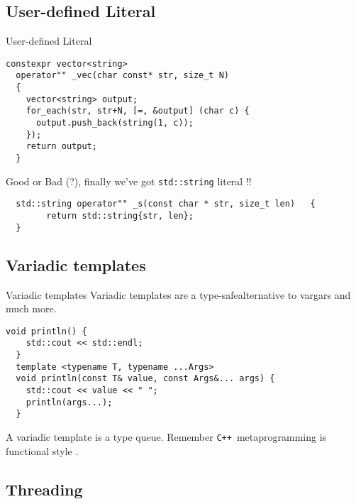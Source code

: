 \documentclass[svgnames,smaller]{beamer}
\newcommand*{\cpp}{\texttt{C++}}
\begin{document}
\subsection{User-defined Literal}

\begin{frame}[fragile]{User-defined Literal}
  \begin{lstlisting}[title={\texttt{""\_vec}}]
  constexpr vector<string>
  operator"" _vec(char const* str, size_t N)
  {
    vector<string> output;
    for_each(str, str+N, [=, &output] (char c) {
      output.push_back(string(1, c));
    });
    return output;
  }
  \end{lstlisting}

  \begin{block}{Good or Bad (?), finally we've got \texttt{std::string} literal !!}
    \begin{lstlisting}
  std::string operator"" _s(const char * str, size_t len)	{
	    return std::string{str, len};
  }
    \end{lstlisting}
  \end{block}
\end{frame}


\subsection{Variadic templates}

\begin{frame}[fragile]{Variadic templates}
  Variadic templates are a type-safe\footnotemark[1] alternative to vargars and
  much more.

  \begin{lstlisting}[title={println}]
  void println() {
    std::cout << std::endl;
  }
  template <typename T, typename ...Args>
  void println(const T& value, const Args&... args) {
    std::cout << value << " ";
    println(args...);
  }
  \end{lstlisting}

  A variadic template is a type queue.
  Remember \cpp\ metaprogramming is functional style \footnotemark[2].
\end{frame}

\subsection{Threading}
\end{document}

